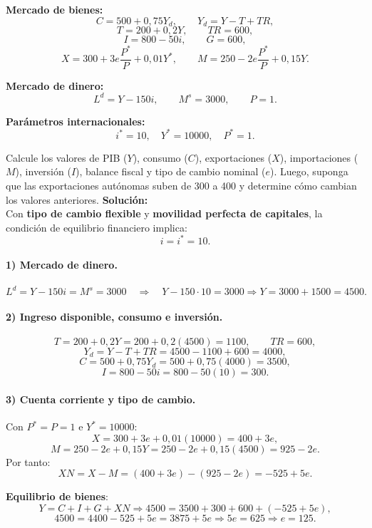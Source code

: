 \documentclass[11pt,addpoints]{article}
\begin{document}
\medskip
\textbf{Mercado de bienes:}
\[
C = 500 + 0{,}75Y_d, \qquad Y_d = Y - T + TR,
\]
\[
T = 200 + 0{,}2Y, \qquad TR = 600,
\]
\[
I = 800 - 50i, \qquad G = 600,
\]
\[
X = 300 + 3e\frac{P^*}{P} + 0{,}01Y^*, \qquad
M = 250 - 2e\frac{P^*}{P} + 0{,}15Y.
\]

\textbf{Mercado de dinero:}
\[
L^d = Y - 150i, \qquad M^s = 3000, \qquad P = 1.
\]



\textbf{Parámetros internacionales:}
\[
i^* = 10, \quad Y^* = 10000, \quad P^* = 1.
\]

\medskip
Calcule los valores de PIB ($Y$), consumo ($C$), exportaciones ($X$), importaciones ($M$), inversión ($I$), balance fiscal y tipo de cambio nominal ($e$). Luego, suponga que las exportaciones autónomas suben de 300 a 400 y determine cómo cambian los valores anteriores.
\newpage
\vspace*{0.5cm}
\textbf{Solución:}\\[0.1cm]
Con \textbf{tipo de cambio flexible} y \textbf{movilidad perfecta de capitales}, la condición de equilibrio financiero implica:
\[
i = i^* = 10.
\]

\paragraph{1) Mercado de dinero.} 
\[
L^d = Y - 150i = M^s = 3000 \quad\Rightarrow\quad
Y - 150\cdot 10 = 3000 \Rightarrow Y = 3000 + 1500 = 4500.
\]

\paragraph{2) Ingreso disponible, consumo e inversión.}
\[
T = 200 + 0{,}2Y = 200 + 0{,}2(4500) = 1100,
\qquad
TR = 600,
\]
\[
Y_d = Y - T + TR = 4500 - 1100 + 600 = 4000,
\]
\[
C = 500 + 0{,}75Y_d = 500 + 0{,}75(4000) = 3500,
\]
\[
I = 800 - 50i = 800 - 50(10) = 300.
\]

\paragraph{3) Cuenta corriente y tipo de cambio.}
Con $P^* = P = 1$ e $Y^* = 10000$:
\[
X = 300 + 3e + 0{,}01(10000) = 400 + 3e,
\]
\[
M = 250 - 2e + 0{,}15Y = 250 - 2e + 0{,}15(4500) = 925 - 2e.
\]
Por tanto:
\[
XN = X - M = (400 + 3e) - (925 - 2e) = -525 + 5e.
\]

\textbf{Equilibrio de bienes}:
\[
Y = C + I + G + XN \Rightarrow
4500 = 3500 + 300 + 600 + (-525 + 5e),
\]
\[
4500 = 4400 - 525 + 5e = 3875 + 5e \Rightarrow
5e = 625 \Rightarrow e = 125.
\]
\end{document}
